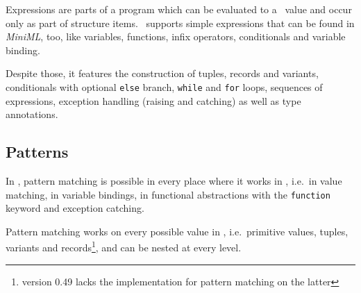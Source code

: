 Expressions are parts of a program which can be evaluated to a \ocaml\ value and
occur only as part of structure items.
\easyocaml\ supports simple expressions that can be found in \textsl{MiniML},
too, like variables, functions, infix operators, conditionals and variable
binding.

Despite those, it features the construction of tuples, records and variants,
conditionals with optional \texttt{else} branch, \texttt{while} and
\texttt{for} loops, sequences of expressions, exception handling (raising and
catching) as well as type annotations.

\subsection*{Patterns}

In \easyocaml, pattern matching is possible in every place where it works in
\ocaml, i.e.\ in value matching, in variable bindings, in
functional abstractions with the \texttt{function} keyword and exception catching.

Pattern matching works on every possible value in \easyocaml, i.e.\ primitive
values, tuples, variants and records\footnote{version 0.49 lacks the
implementation for pattern matching on the latter}, and can be nested at every
level.

